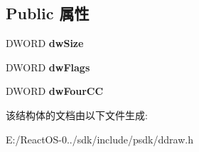 \subsection*{Public 属性}
\begin{DoxyCompactItemize}
\item 
\mbox{\label{struct___d_d_p_i_x_e_l_f_o_r_m_a_t_a4765b40be2b51f564dd772df38a28d13}} 
D\+W\+O\+RD {\bfseries dw\+Size}
\item 
\mbox{\label{struct___d_d_p_i_x_e_l_f_o_r_m_a_t_ad26631effea4a5e7591bfd74166f9378}} 
D\+W\+O\+RD {\bfseries dw\+Flags}
\item 
\mbox{\label{struct___d_d_p_i_x_e_l_f_o_r_m_a_t_a694e917d63f07e4c4ff3e6c0be888af1}} 
D\+W\+O\+RD {\bfseries dw\+Four\+CC}
\end{DoxyCompactItemize}


该结构体的文档由以下文件生成\+:\begin{DoxyCompactItemize}
\item 
E\+:/\+React\+O\+S-\/0../sdk/include/psdk/ddraw.\+h\end{DoxyCompactItemize}
